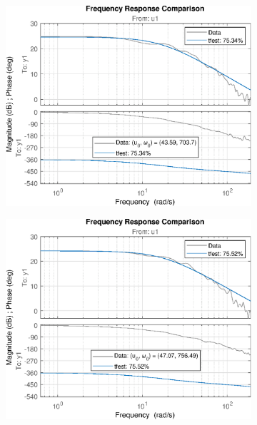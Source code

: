 \begin{figure}[H]
    \begin{minipage}{0.32\textwidth}
       \begin{figure}[H]
            \includegraphics[width = \textwidth]{./figs/small_perturbation/freq_Compare_1550.eps}
       \end{figure}
    \end{minipage}
    \begin{minipage}{0.32\textwidth}
       \begin{figure}[H]
            \includegraphics[width = \textwidth]{./figs/small_perturbation/freq_Compare_1600.eps}

\end{figure}
\end{minipage}
\end{figure}
